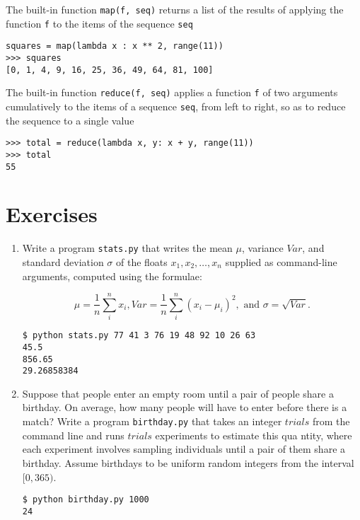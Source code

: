 \documentclass[8pt,a4paper,compress]{beamer}
\begin{document}
\begin{frame}[fragile]
The built-in function \lstinline{map(f, seq)} returns a list of the results of applying the function \lstinline{f} to the items of the sequence \lstinline{seq}
\begin{lstlisting}[language={}]
squares = map(lambda x : x ** 2, range(11))
>>> squares
[0, 1, 4, 9, 16, 25, 36, 49, 64, 81, 100]
\end{lstlisting}

\bigskip

The built-in function \lstinline{reduce(f, seq)} applies a function \lstinline{f} of two arguments cumulatively to the items of a sequence \lstinline{seq}, from left to right, so as to reduce the sequence to a single value
\begin{lstlisting}[language={}]
>>> total = reduce(lambda x, y: x + y, range(11))
>>> total
55
\end{lstlisting}
\end{frame}

\section{Exercises}
\begin{frame}[fragile]
\begin{enumerate}
\item Write a program \lstinline{stats.py} that writes the mean $\mu$, variance $Var$, and standard deviation $\sigma$ of the floats $x_1, 
x_2, \dots, x_n$ supplied as command-line arguments, computed using the formulae:

\[
\mu = \frac{1}{n}\sum\limits_i^n x_i, 
Var = \frac{1}{n}\sum\limits_i^n (x_i - \mu_i)^2, \text{ and }
\sigma = \sqrt{Var}.
\]

\begin{lstlisting}[language={}]
$ python stats.py 77 41 3 76 19 48 92 10 26 63
45.5
856.65
29.26858384
\end{lstlisting}

\item Suppose that people enter an empty room until a pair of people share a birthday. On average, how many people will have to enter 
before there is a match? Write a program \lstinline{birthday.py} that takes an integer $trials$ from the command line and runs $trials$ experiments to estimate this qua
ntity, where each experiment involves sampling individuals until a pair of them share a birthday. Assume birthdays to be uniform random integers from the interval $[0, 
365)$. 

\begin{lstlisting}[language={}]
$ python birthday.py 1000
24
\end{lstlisting}
\end{enumerate}
\end{frame}
\end{document}
